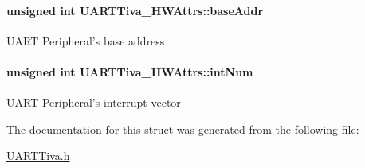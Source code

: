 \paragraph[{base\-Addr}]{\setlength{\rightskip}{0pt plus 5cm}unsigned int U\-A\-R\-T\-Tiva\-\_\-\-H\-W\-Attrs\-::base\-Addr}\label{struct_u_a_r_t_tiva___h_w_attrs_abecf13eceeaf44f1781aa2bfae1edad4}
U\-A\-R\-T Peripheral's base address 
\paragraph[{int\-Num}]{\setlength{\rightskip}{0pt plus 5cm}unsigned int U\-A\-R\-T\-Tiva\-\_\-\-H\-W\-Attrs\-::int\-Num}\label{struct_u_a_r_t_tiva___h_w_attrs_a3353583599880bab5429fcbbd189f89c}
U\-A\-R\-T Peripheral's interrupt vector 

The documentation for this struct was generated from the following file\-:\begin{DoxyCompactItemize}
\item 
\hyperlink{_u_a_r_t_tiva_8h}{U\-A\-R\-T\-Tiva.\-h}\end{DoxyCompactItemize}
